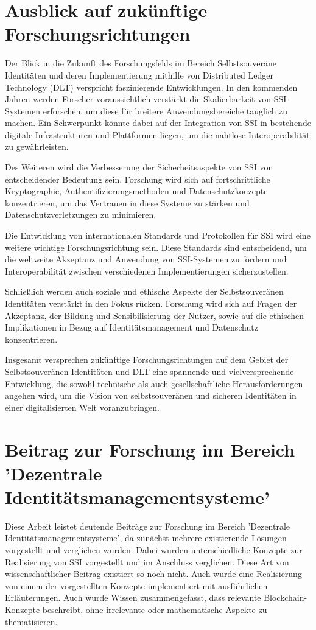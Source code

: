 \section{Ausblick auf zukünftige Forschungsrichtungen}

Der Blick in die Zukunft des Forschungsfelds im Bereich Selbstsouveräne Identitäten und deren Implementierung mithilfe von Distributed Ledger Technology (DLT) verspricht faszinierende Entwicklungen. In den kommenden Jahren werden Forscher voraussichtlich verstärkt die Skalierbarkeit von SSI-Systemen erforschen, um diese für breitere Anwendungsbereiche tauglich zu machen. Ein Schwerpunkt könnte dabei auf der Integration von SSI in bestehende digitale Infrastrukturen und Plattformen liegen, um die nahtlose Interoperabilität zu gewährleisten.

Des Weiteren wird die Verbesserung der Sicherheitsaspekte von SSI von entscheidender Bedeutung sein. Forschung wird sich auf fortschrittliche Kryptographie, Authentifizierungsmethoden und Datenschutzkonzepte konzentrieren, um das Vertrauen in diese Systeme zu stärken und Datenschutzverletzungen zu minimieren.

Die Entwicklung von internationalen Standards und Protokollen für SSI wird eine weitere wichtige Forschungsrichtung sein. Diese Standards sind entscheidend, um die weltweite Akzeptanz und Anwendung von SSI-Systemen zu fördern und Interoperabilität zwischen verschiedenen Implementierungen sicherzustellen.

Schließlich werden auch soziale und ethische Aspekte der Selbstsouveränen Identitäten verstärkt in den Fokus rücken. Forschung wird sich auf Fragen der Akzeptanz, der Bildung und Sensibilisierung der Nutzer, sowie auf die ethischen Implikationen in Bezug auf Identitätsmanagement und Datenschutz konzentrieren.

Insgesamt versprechen zukünftige Forschungsrichtungen auf dem Gebiet der Selbstsouveränen Identitäten und DLT eine spannende und vielversprechende Entwicklung, die sowohl technische als auch gesellschaftliche Herausforderungen angehen wird, um die Vision von selbstsouveränen und sicheren Identitäten in einer digitalisierten Welt voranzubringen.

\section{Beitrag zur Forschung im Bereich 'Dezentrale Identitätsmanagementsysteme'}
Diese Arbeit leistet deutende Beiträge zur Forschung im Bereich 'Dezentrale Identitätsmanagementsysteme', da zunächst mehrere existierende Lösungen vorgestellt und verglichen wurden. Dabei wurden unterschiedliche Konzepte zur Realisierung von SSI vorgestellt und im Anschluss verglichen.  Diese Art von wissenschaftlicher Beitrag existiert so noch nicht. Auch wurde eine Realisierung von einem der vorgestellten Konzepte implementiert mit ausführlichen Erläuterungen. Auch wurde Wissen zusammengefasst, dass relevante Blockchain-Konzepte beschreibt, ohne irrelevante oder mathematische Aspekte zu thematisieren.